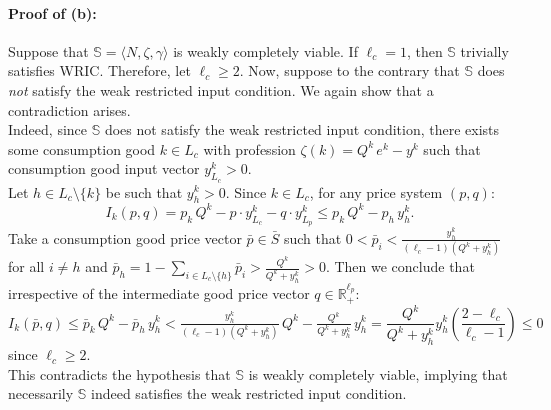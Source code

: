 \documentclass[11pt,fleqn]{article}
\begin{document}
\paragraph{Proof of (b):}
Suppose that $\mathbb S = \langle N, \zeta , \gamma \rangle$ is weakly completely viable. If $\ell_c =1$, then $\mathbb S$ trivially satisfies WRIC. Therefore, let $\ell_c \geqslant 2$.  Now, suppose to the contrary that $\mathbb S$ does \emph{not} satisfy the weak restricted input condition. We again show that a contradiction arises. \\
Indeed, since $\mathbb S$ does not satisfy the weak restricted input condition, there exists some consumption good $k \in L_c$ with profession $\zeta (k) = Q^k \, e^k - y^k$ such that consumption good input vector $y^k_{L_c} >0$. \\
Let $h \in L_c \setminus \{ k \}$ be such that $y^k_h >0$.  Since $k \in L_c$, for any price system $(p,q) \colon$
\[
I_k (p,q) = p_k \, Q^k - p \cdot y^k_{L_c} - q \cdot y^k_{L_p} \leqslant  p_k \, Q^k - p_h \, y^k_h .
\]
Take a consumption good price vector $\bar p \in \bar S$ such that $0< \bar p_i < \tfrac{y^k_h}{(\ell_c-1)(Q^k + y^k_h)}$ for all $i \neq h$ and $\bar p_h = 1- \sum_{i \in L_c \setminus \{ h \}} \bar p_i  > \tfrac{Q^k}{Q^k+y^k_h}>0$. Then we conclude that irrespective of the intermediate good price vector $q \in \mathbb R^{\ell_p}_+ \colon$
\[
I_k (\bar p,q) \leqslant  \bar p_k \, Q^k - \bar p_h \, y^k_h < \tfrac{y^k_h}{(\ell_c-1)(Q^k + y^k_h)} \, Q^k - \tfrac{Q^k}{Q^k+y^k_h} \, y^k_h = \frac{Q^k}{Q^k+y^k_h} y^k_h \left( \frac{2- \ell_c}{\ell_c -1} \right) \leqslant 0 
\]
since $\ell_c \geqslant 2$. \\
This contradicts the hypothesis that $\mathbb S$ is weakly completely viable, implying that necessarily $\mathbb S$ indeed satisfies the weak restricted input condition.
\end{document}

